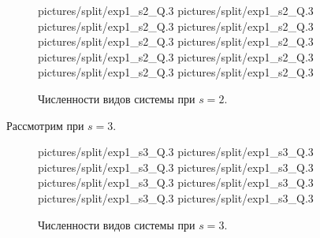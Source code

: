 \begin{figure}[H]
    \centering
       {pictures/split/exp1_s2_Q}{.3}
      {pictures/split/exp1_s2_Q}{.3}
      {pictures/split/exp1_s2_Q}{.3}
      {pictures/split/exp1_s2_Q}{.3}
      {pictures/split/exp1_s2_Q}{.3}
      {pictures/split/exp1_s2_Q}{.3}
      {pictures/split/exp1_s2_Q}{.3}
      {pictures/split/exp1_s2_Q}{.3}
      {pictures/split/exp1_s2_Q}{.3}
     {pictures/split/exp1_s2_Q}{.3}
\caption{Численности видов системы при \(s=2\).}  \label{fig:split_exp1_s2}
\end{figure}


Рассмотрим при \(s=3\).
\begin{figure}[H]
    \centering
       {pictures/split/exp1_s3_Q}{.3}
      {pictures/split/exp1_s3_Q}{.3}
      {pictures/split/exp1_s3_Q}{.3}
      {pictures/split/exp1_s3_Q}{.3}
      {pictures/split/exp1_s3_Q}{.3}
      {pictures/split/exp1_s3_Q}{.3}
     {pictures/split/exp1_s3_Q}{.3}
     {pictures/split/exp1_s3_Q}{.3}
\caption{Численности видов системы при \(s=3\).}  \label{fig:split_exp1_s3}
\end{figure}

